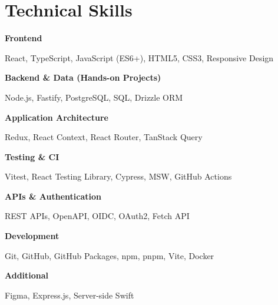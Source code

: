 \section{Technical Skills}

\textbf{Frontend}

React, TypeScript, JavaScript (ES6+), HTML5, CSS3, Responsive Design

\vspace{0.2em}

\textbf{Backend \& Data (Hands-on Projects)}

Node.js, Fastify, PostgreSQL, SQL, Drizzle ORM

\vspace{0.2em}

\textbf{Application Architecture}

Redux, React Context, React Router, TanStack Query

\vspace{0.2em}

\textbf{Testing \& CI}

Vitest, React Testing Library, Cypress, MSW, GitHub Actions

\vspace{0.2em}

\textbf{APIs \& Authentication}

REST APIs, OpenAPI, OIDC, OAuth2, Fetch API

\vspace{0.2em}

\textbf{Development}

Git, GitHub, GitHub Packages, npm, pnpm, Vite, Docker

\vspace{0.2em}

\textbf{Additional}

Figma, Express.js, Server-side Swift
